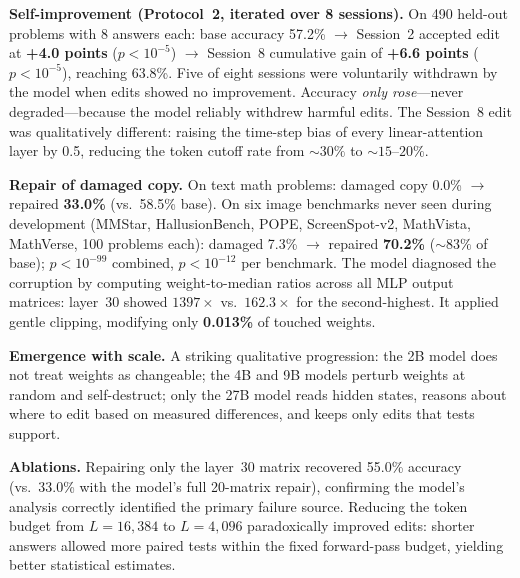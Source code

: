\documentclass[11pt,a4paper]{article}
\begin{document}
\textbf{Self-improvement (Protocol~2, iterated over 8 sessions).} On 490 held-out problems with 8 answers each: base accuracy 57.2\% $\rightarrow$ Session~2 accepted edit at \textbf{+4.0 points} ($p < 10^{-5}$) $\rightarrow$ Session~8 cumulative gain of \textbf{+6.6 points} ($p < 10^{-5}$), reaching 63.8\%. Five of eight sessions were voluntarily withdrawn by the model when edits showed no improvement. Accuracy \emph{only rose}---never degraded---because the model reliably withdrew harmful edits. The Session~8 edit was qualitatively different: raising the time-step bias of every linear-attention layer by 0.5, reducing the token cutoff rate from ${\sim}30\%$ to ${\sim}15$--$20\%$.

\textbf{Repair of damaged copy.} On text math problems: damaged copy 0.0\% $\rightarrow$ repaired \textbf{33.0\%} (vs.\ 58.5\% base). On six image benchmarks never seen during development (MMStar, HallusionBench, POPE, ScreenSpot-v2, MathVista, MathVerse, 100 problems each): damaged 7.3\% $\rightarrow$ repaired \textbf{70.2\%} (${\sim}83\%$ of base); $p < 10^{-99}$ combined, $p < 10^{-12}$ per benchmark. The model diagnosed the corruption by computing weight-to-median ratios across all MLP output matrices: layer~30 showed $1397\times$ vs.\ $162.3\times$ for the second-highest. It applied gentle clipping, modifying only \textbf{0.013\%} of touched weights.

\textbf{Emergence with scale.} A striking qualitative progression: the 2B model does not treat weights as changeable; the 4B and 9B models perturb weights at random and self-destruct; only the 27B model reads hidden states, reasons about where to edit based on measured differences, and keeps only edits that tests support.

\textbf{Ablations.} Repairing only the layer~30 matrix recovered 55.0\% accuracy (vs.\ 33.0\% with the model's full 20-matrix repair), confirming the model's analysis correctly identified the primary failure source. Reducing the token budget from $L{=}16{,}384$ to $L{=}4{,}096$ paradoxically improved edits: shorter answers allowed more paired tests within the fixed forward-pass budget, yielding better statistical estimates.
\end{document}
